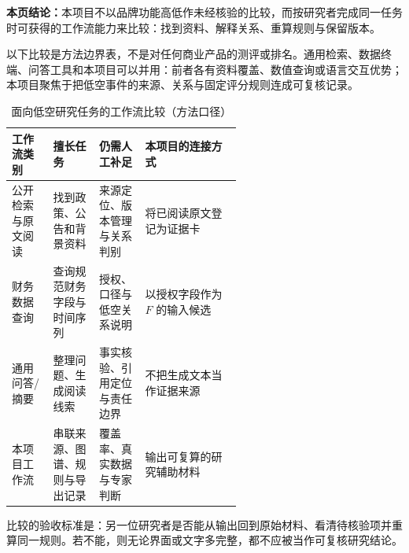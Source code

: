 \textbf{本页结论：}本项目不以品牌功能高低作未经核验的比较，而按研究者完成同一任务时可获得的工作流能力来比较：找到资料、解释关系、重算规则与保留版本。

以下比较是方法边界表，不是对任何商业产品的测评或排名。通用检索、数据终端、问答工具和本项目可以并用：前者各有资料覆盖、数值查询或语言交互优势；本项目聚焦于把低空事件的来源、关系与固定评分规则连成可复核记录。

\begin{table}[htbp]
\centering
\caption{面向低空研究任务的工作流比较（方法口径）}
\label{tab:wty-workflow-comparison}
\small
\begin{tabularx}{\linewidth}{p{0.18\linewidth}p{0.20\linewidth}p{0.20\linewidth}X}
\toprule
工作流类别 & 擅长任务 & 仍需人工补足 & 本项目的连接方式 \\
\midrule
公开检索与原文阅读 & 找到政策、公告和背景资料 & 来源定位、版本管理与关系判别 & 将已阅读原文登记为证据卡 \\
财务数据查询 & 查询规范财务字段与时间序列 & 授权、口径与低空关系说明 & 以授权字段作为 $F$ 的输入候选 \\
通用问答/摘要 & 整理问题、生成阅读线索 & 事实核验、引用定位与责任边界 & 不把生成文本当作证据来源 \\
本项目工作流 & 串联来源、图谱、规则与导出记录 & 覆盖率、真实数据与专家判断 & 输出可复算的研究辅助材料 \\
\bottomrule
\end{tabularx}
\end{table}

比较的验收标准是：另一位研究者是否能从输出回到原始材料、看清待核验项并重算同一规则。若不能，则无论界面或文字多完整，都不应被当作可复核研究结论。

